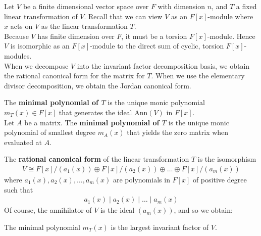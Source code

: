 \documentclass{memoir}
\begin{document}


Let \(V\) be a finite dimensional vector space over \(F\) with dimension \(n\), and \(T\) a fixed linear transformation of \(V\). Recall that we can view \(V\) as an \(F[x]\)-module where \(x\) acts on \(V\) as the linear transformation \(T\).\\

Because \(V\) has finite dimension over \(F\), it must be a torsion \(F[x]\)-module. Hence \(V\) is isomorphic as an \(F[x]\)-module to the direct sum of cyclic, torsion \(F[x]\)-modules.\\

When we decompose \(V\) into the invariant factor decomposition basis, we obtain the rational canonical form for the matrix for \(T\). When we use the elementary divisor decomposition, we obtain the Jordan canonical form.

\begin{defn}
 The \textbf{minimal polynomial of \(T\)} is the unique monic polynomial \(m_T(x) \in F[x]\) that generates the ideal \(\textrm{Ann}(V)\) in \(F[x]\).\\

 Let \(A\) be a matrix. The \textbf{minimal polynomial of \(T\)} is the unique monic polynomial of smallest degree \(m_A(x)\) that yields the zero matrix when evaluated at \(A\).
\end{defn}

The \textbf{rational canonical form} of the linear transformation \(T\) is the isomorphism
\begin{align*}
	V \cong F[x] / (a_1(x)) \oplus F[x] / (a_2(x)) \oplus \ldots \oplus F[x] / (a_m(x))
\end{align*}
where \(a_1(x),a_2(x),\ldots,a_m(x)\) are polynomials in \(F[x]\) of positive degree such that
 \begin{align*}
	 a_1(x) \mid a_2(x) \mid \ldots\mid a_m(x)
\end{align*}
Of course, the annihilator of \(V\) is the ideal \((a_m(x))\), and so we obtain:
\begin{prop}
	The minimal polynomial \(m_T(x)\) is the largest invariant factor of \(V\).
\end{prop}
\end{document}
